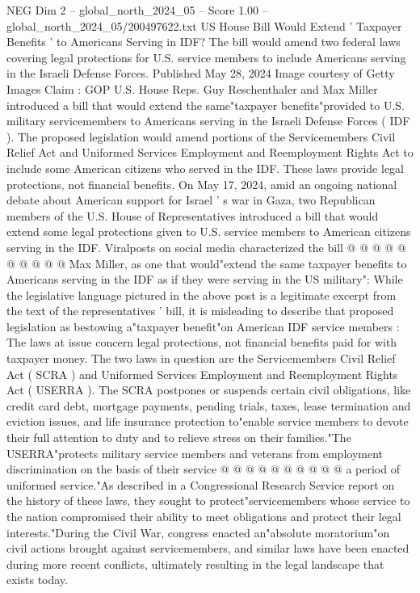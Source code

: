 \begin{textsample}{NEG Dim 2 – global\_north\_2024\_05 – Score 1.00 – global\_north\_2024\_05/200497622.txt}  \label{ex:f2_neg_063}
US House Bill Would Extend ' Taxpayer Benefits ' to Americans Serving in IDF?
The bill would amend two federal laws covering legal protections for U.S. service members to include Americans serving in the Israeli Defense Forces.
Published May 28, 2024 Image courtesy of Getty Images Claim : GOP U.S.
House Reps.
Guy Reschenthaler and Max Miller introduced a bill that would extend the same"taxpayer benefits"provided to U.S. military servicemembers to Americans serving in the Israeli Defense Forces ( IDF ).
The proposed legislation would amend portions of the Servicemembers Civil Relief Act and Uniformed Services Employment and Reemployment Rights Act to include some American citizens who served in the IDF.
These laws provide legal protections, not financial benefits.
On May 17, 2024, amid an ongoing national debate about American support for Israel ' s war in Gaza, two Republican members of the U.S.
House of Representatives introduced a bill that would extend some legal protections given to U.S. service members to American citizens serving in the IDF.
Viralposts on social media characterized the bill @ @ @ @ @ @ @ @ @ @ Max Miller, as one that would"extend the same taxpayer benefits to Americans serving in the IDF as if they were serving in the US military": While the legislative language pictured in the above post is a legitimate excerpt from the text of the representatives ' bill, it is misleading to describe that proposed legislation as bestowing a"taxpayer benefit"on American IDF service members : The laws at issue concern legal protections, not financial benefits paid for with taxpayer money.
The two laws in question are the Servicemembers Civil Relief Act ( SCRA ) and Uniformed Services Employment and Reemployment Rights Act ( USERRA ).
The SCRA postpones or suspends certain civil obligations, like credit card debt, mortgage payments, pending trials, taxes, lease termination and eviction issues, and life insurance protection to"enable service members to devote their full attention to duty and to relieve stress on their families."The USERRA"protects military service members and veterans from employment discrimination on the basis of their service @ @ @ @ @ @ @ @ @ @ a period of uniformed service."As described in a Congressional Research Service report on the history of these laws, they sought to protect"servicemembers whose service to the nation compromised their ability to meet obligations and protect their legal interests."During the Civil War, congress enacted an"absolute moratorium"on civil actions brought against servicemembers, and similar laws have been enacted during more recent conflicts, ultimately resulting in the legal landscape that exists today.

\end{textsample}
